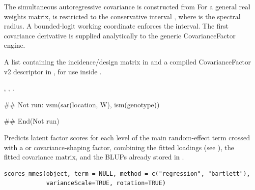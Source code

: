 \documentclass[a4paper]{book}
\begin{document}
%
\begin{Details}\relax
The simultaneous autoregressive covariance is constructed from  For a general real weights matrix,  is restricted to the conservative interval , where  is the spectral radius.  A bounded-logit working coordinate enforces the interval.  The first covariance derivative is supplied analytically to the generic CovarianceFactor engine.
\end{Details}
%
\begin{Value}
A list containing the incidence/design matrix in  and a compiled CovarianceFactor v2 descriptor in , for use inside .
\end{Value}
%
\begin{SeeAlso}\relax
{}, , .
\end{SeeAlso}
%
\begin{Examples}
\begin{ExampleCode}
## Not run: 
vsm(sar(location, W), ism(genotype))

## End(Not run)
\end{ExampleCode}
\end{Examples}
%
\begin{Description}\relax
Predicts latent factor scores for each level of the main random-effect term
crossed with a  or  covariance-shaping factor,
combining the fitted loadings (see ), the fitted
covariance matrix, and the BLUPs already stored in .
\end{Description}
%
\begin{Usage}
\begin{verbatim}
scores_mmes(object, term = NULL, method = c("regression", "bartlett"), 
            varianceScale=TRUE, rotation=TRUE)
\end{verbatim}
\end{Usage}
%
\end{document}
